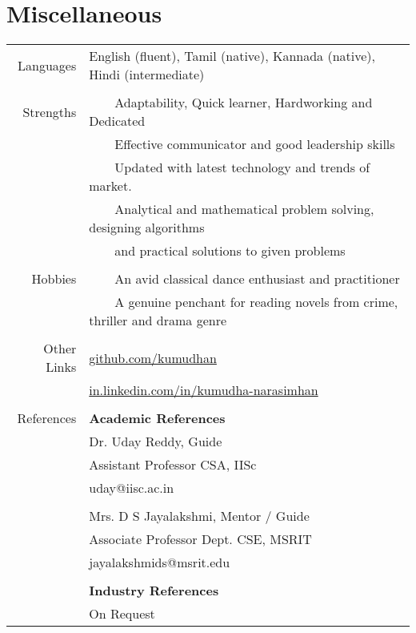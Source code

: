 \documentclass[a4paper,10pt]{article} %
\newcommand{\tabitem}{~~\llap{\textbullet}~~}
\begin{document}
\section{Miscellaneous}
\begin{tabular}{rl}
Languages & English (fluent), Tamil (native), Kannada (native), Hindi (intermediate)\\
&\\
Strengths & \tabitem Adaptability, Quick learner, Hardworking and Dedicated\\
& \tabitem Effective communicator and good leadership skills \\
& \tabitem Updated with latest technology and trends of market.\\
& \tabitem Analytical and mathematical problem solving, designing algorithms \\
& ~~~~and practical solutions to given problems \\
& \\
Hobbies & \tabitem An avid classical dance enthusiast and practitioner\\
& \tabitem A genuine penchant for reading novels from crime, thriller and drama genre\\
& \\
Other Links & \href{https://github.com/kumudhan}{github.com/kumudhan} \\
& \href{http://in.linkedin.com/in/kumudha-narasimhan}{in.linkedin.com/in/kumudha-narasimhan}\\
&\\
References & \textbf{Academic References} \\
& Dr. Uday Reddy, Guide \\
& Assistant Professor CSA, IISc\\
& uday@iisc.ac.in \\
&\\
& Mrs. D S Jayalakshmi, Mentor / Guide  \\
& Associate Professor Dept. CSE, MSRIT \\
& jayalakshmids@msrit.edu\\
&\\

& \textbf{Industry References} \\
& On Request \\
\end{tabular}
\end{document}
